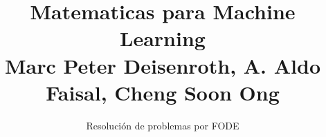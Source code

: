 \normalfont

\author{\Large Resolución de problemas por FODE}
\title{Matematicas para Machine Learning\\ \small Marc Peter Deisenroth, A. Aldo Faisal, Cheng Soon Ong}
\date{}
\pagestyle{empty}
\maketitle
\thispagestyle{empty}
\let\cleardoublepage\clearpage
\tableofcontents								%


 
\let\cleardoublepage\clearpage